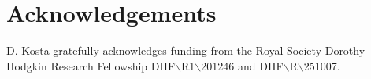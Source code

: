 \documentclass[a4paper, 12pt]{article}
\newcommand{\QQ}{\mathbb Q}
\newcommand{\ZZ}{\mathbb Z}
\theoremstyle{plain}
\theoremstyle{definition}
\theoremstyle{remark}
\begin{document}
\section*{Acknowledgements}
D. Kosta gratefully acknowledges funding from the Royal Society Dorothy Hodgkin Research Fellowship DHF$\backslash$R1$\backslash$201246 and DHF$\backslash$R$\backslash$251007.




\end{document}
